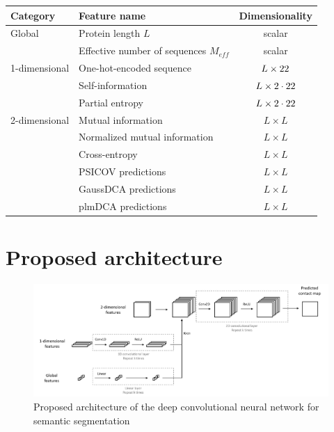   \begin{table}[H]
    \centering
    \begin{tabular}{|l|l|c|}
      \hline
      Category & Feature name & Dimensionality \\
      \hline
      \hline
      Global & Protein length $L$ & scalar \\
             & Effective number of sequences $M_{eff}$ & scalar \\
      \hline
      1-dimensional & One-hot-encoded sequence & $L \times 22$ \\
                    & Self-information & $L \times 2 \cdot 22$ \\
                    & Partial entropy & $L \times 2 \cdot 22$ \\
      \hline
      2-dimensional & Mutual information & $L \times L$ \\
                    & Normalized mutual information & $L \times L$ \\
                    & Cross-entropy & $L \times L$ \\
                    & PSICOV predictions & $L \times L$ \\
                    & GaussDCA predictions & $L \times L$ \\
                    & plmDCA predictions & $L \times L$ \\
      \hline
    \end{tabular}
    \label{hyperparams}
  \end{table}

\section{Proposed architecture}

  \begin{figure}[H]
    \begin{center}
      \includegraphics[width=\textwidth, keepaspectratio]{imgs/architecture.png}
       \caption{Proposed architecture of the deep convolutional neural network for semantic segmentation}
      \label{architecture}
    \end{center}
  \end{figure}

